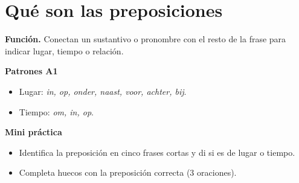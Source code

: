 \section{Qué son las preposiciones}
\textbf{Función.} Conectan un sustantivo o pronombre con el resto de la frase para indicar lugar, tiempo o relación.

\textbf{Patrones A1}
\begin{itemize}[leftmargin=*]
  \item Lugar: \textit{in, op, onder, naast, voor, achter, bij}.
  \item Tiempo: \textit{om, in, op}.
\end{itemize}

\textbf{Mini práctica}
\begin{itemize}[leftmargin=*]
  \item Identifica la preposición en cinco frases cortas y di si es de lugar o tiempo.
  \item Completa huecos con la preposición correcta (3 oraciones).
\end{itemize}
